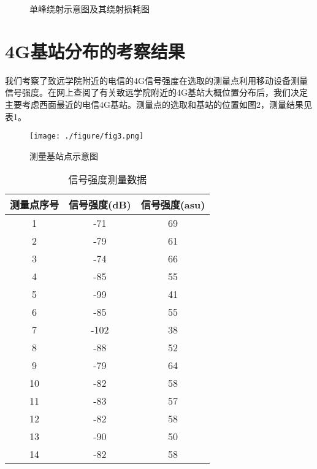 \documentclass{article}
\begin{document}
\begin{figure}[htbp]
\centering
{}%
%

\centering
\caption{单峰绕射示意图及其绕射损耗图}
\end{figure}

    
    
  
  
\section{4G基站分布的考察结果}
    我们考察了致远学院附近的电信的4G信号强度在选取的测量点利用移动设备测量信号强度。在网上查阅了有关致远学院附近的4G基站大概位置分布后，我们决定主要考虑西面最近的电信4G基站。测量点的选取和基站的位置如图2，测量结果见表1。
    
    \begin{figure}
        \centering
        \texttt{[image: ./figure/fig3.png]}
        \caption{测量基站点示意图}
        \label{fig:my_label}
    \end{figure}
    
    
    
 
    
    \begin{table}
    \centering
    \begin{tabular}{|c|c|c|}
    \hline
        测量点序号 & 信号强度(dB) & 信号强度(asu) \\
        \hline
         1& -71& 69 \\
         2& -79& 61\\
         3& -74& 66\\
         4& -85& 55\\
         5& -99& 41\\
         6& -85& 55\\
         7& -102& 38\\
         8& -88& 52\\
         9& -79& 64\\
         10& -82& 58\\
         11& -83& 57\\
         12& -82& 58\\
         13& -90& 50\\
         14& -82& 58 \\
         \hline
       
    \end{tabular}
    \caption{信号强度测量数据}
\end{table}
\end{document}
